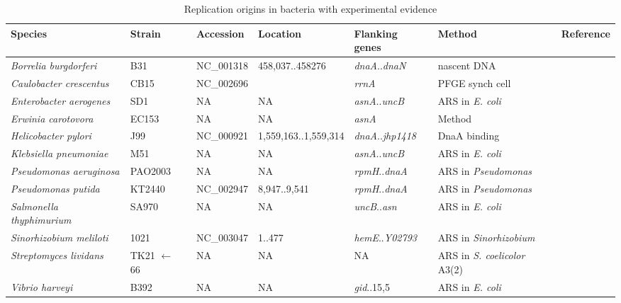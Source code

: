 \begin{table}[ht]
\begin{center}
\tiny
\begin{tabular}{lllllll}
\hline \hline
Species & Strain & Accession & Location & Flanking genes& Method & Reference\\
\hline
\textit{Borrelia burgdorferi} & B31 & NC\_001318 & 458,037..458276 & \textit{dnaA}..\textit{dnaN}& nascent DNA & \cite{PicardeauM1999}\\
\textit{Caulobacter crescentus} & CB15 & NC\_002696 &  & \textit{rrnA} & PFGE synch cell & \cite{DingwallA1989}\\
\textit{Enterobacter aerogenes} & SD1 & NA & NA & \textit{asnA}..\textit{uncB}& ARS in \textit{E. coli} & \cite{HardingNE1982}\\
\textit{Erwinia carotovora} & EC153 & NA & NA & \textit{asnA}& Method & \cite{TakedaY1982}\\
\textit{Helicobacter pylori} & J99 & NC\_000921& 1,559,163..1,559,314& \textit{dnaA}..\textit{jhp1418}& DnaA binding & \cite{ZawilakA2001}\\
\textit{Klebsiella pneumoniae} & M51 & NA & NA & \textit{asnA}..\textit{uncB}& ARS in \textit{E. coli} & \cite{HardingNE1982}\\
\textit{Pseudomonas aeruginosa} & PAO2003 & NA & NA & \textit{rpmH}..\textit{dnaA}& ARS in \textit{Pseudomonas} & \cite{YeeTW1990}\\
\textit{Pseudomonas putida} & KT2440 & NC\_002947 & 8,947..9,541 & \textit{rpmH}..\textit{dnaA}& ARS in \textit{Pseudomonas} & \cite{YeeTW1990}\\
\textit{Salmonella thyphimurium} & SA970 & NA & NA & \textit{uncB}..\textit{asn} & ARS in \textit{E. coli} & \cite{ZyskindJW1979, ZyskindJW1980}\\
\textit{Sinorhizobium meliloti} & 1021 & NC\_003047 & 1..477 & \textit{hemE}..\textit{Y02793} & ARS in \textit{Sinorhizobium} & \cite{SibleyCD2006}\\
\textit{Streptomyces lividans} & TK21 $\leftarrow$ 66 & NA & NA & NA & ARS in \textit{S. coelicolor} A3(2) & \cite{ZakrezewskaCzerwinskaJ1992} \\
\textit{Vibrio harveyi} & B392 & NA & NA & \textit{gid}..15,5& ARS in \textit{E. coli} & \cite{ZyskindJW1983}\\
\hline \hline
\end{tabular}
\caption{Replication origins in bacteria with experimental evidence}
\label{oriexp}
\end{center}
\end{table}
\normalsize
